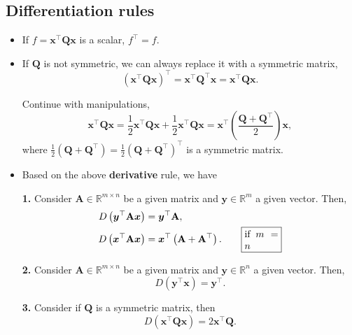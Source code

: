 \documentclass[12pt,thmsa]{article}
\begin{document}
\subsection{Differentiation rules}

\begin{itemize}
	\item If \(f=\boldsymbol{x}^{\top} \boldsymbol{Q} \boldsymbol{x}\) is a scalar, \(f^{\top}=f\).
	
	\item If \(\mathbf{Q}\) is not symmetric, we can always replace it with a symmetric matrix, 
	\[
	\left(\boldsymbol{x}^{\top} \mathbf{Q} \boldsymbol{x}\right)^{\top}=\boldsymbol{x}^{\top} \mathbf{Q}^{\top} \boldsymbol{x}=\boldsymbol{x}^{\top} \mathbf{Q} \boldsymbol{x} .
	\]
	
	Continue with manipulations,
	\[
	\boldsymbol{x}^{\top} \mathbf{Q} \boldsymbol{x}=\frac{1}{2} \boldsymbol{x}^{\top} \mathbf{Q} \boldsymbol{x}+\frac{1}{2} \boldsymbol{x}^{\top} \mathbf{Q x}=\boldsymbol{x}^{\top}\left(\frac{\mathbf{Q}+\mathbf{Q}^{\top}}{2}\right) \boldsymbol{x},
	\]
	where \(\frac{1}{2}\left(\mathbf{Q}+\mathbf{Q}^{\top}\right) = \frac{1}{2}\left(\mathbf{Q}+\mathbf{Q}^{\top}\right)^{\top}\) is a symmetric matrix.
	
	
	\item Based on the above \textbf{derivative} rule, we have

	\textbf{1.} Consider \(\mathbf{A} \in \mathbb{R}^{m \times n}\) be a given matrix and \(\boldsymbol{y} \in \mathbb{R}^{m}\) a given vector. Then,
	\begin{align*}
		D\left(\boldsymbol{y}^{\top} \mathbf{A} \boldsymbol{x}\right) &=
		\boldsymbol{y}^{\top} \mathbf{A}, \\
		D\left(\boldsymbol{x}^{\top} \mathbf{A} \boldsymbol{x}\right) &=
		\boldsymbol{x}^{\top}\left(\mathbf{A}+\mathbf{A}^{\top}\right).  \qquad
		\fbox{\parbox{0.1\textwidth}{ if \(m=n\) }}
	\end{align*}
	
	
	\textbf{2.} Consider \(\mathbf{A} \in \mathbb{R}^{m \times n}\) be a given matrix and \(\boldsymbol{y} \in \mathbb{R}^{n}\) a given vector. Then,
	\[ D\left(\boldsymbol{y}^{\top} \boldsymbol{x}\right)=\boldsymbol{y}^{\top}. \]
	
	\textbf{3.} Consider if \(\mathbf{Q}\) is a symmetric matrix, then
	\[
	D\left(\boldsymbol{x}^{\top} \mathbf{Q} \boldsymbol{x}\right)=2 \boldsymbol{x}^{\top} \mathbf{Q}.
	\]
	

\end{itemize}
\end{document}
